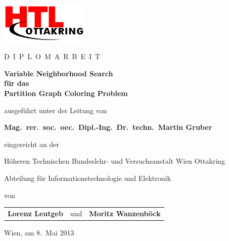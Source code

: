 \begin{titlepage}
\begin{center}
\includegraphics[height=2cm]{../img/htl.png}

\vspace{10mm}

{\Large D}\ {\large I\ P\ L\ O\ M\ A\ R\ B\ E\ I\ T}

\vspace{25mm}

{\Huge\bfseries\sffamily Variable Neighborhood Search}\\[3mm]
{\Huge\bfseries\sffamily für das}\\[3mm]
{\Huge\bfseries\sffamily Partition Graph Coloring Problem}

\vspace{25mm}

ausgeführt unter der Leitung von

\vspace{5mm}

{\large\bfseries Mag.~rer.~soc.~oec.\ Dipl.-Ing.\ Dr.~techn.\ Martin Gruber}

\vspace{5mm}

eingereicht an der

\vspace{5mm}

{\large Höheren Technischen Bundeslehr- und Versuchsanstalt Wien Ottakring}

{\large Abteilung für Informationstechnologie und Elektronik}

\vspace{5mm}

von

\vspace{5mm}

\begin{tabular}{R{5cm}C{2.5cm}L{5cm}}
{\large\bfseries Lorenz Leutgeb} & und & {\large\bfseries Moritz Wanzenböck} \\
\end{tabular}

\end{center}
\vspace*{\fill}

Wien, am 8.~Mai 2013
\end{titlepage}
